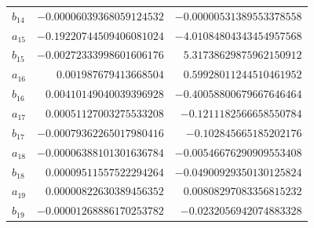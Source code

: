 \documentclass[11pt]{article}
\theoremstyle{definition}
\begin{document}
{\begin{longtable}{lrr}
$b_{14}$ & $-0.00006039368059124532$ & $-0.00000531389553378558$\\
$a_{15}$ & $-0.19220744509406081024$ & $-4.01084804343454957568$\\
$b_{15}$ & $-0.00272333998601606176$ & $5.31738629875962150912$\\
$a_{16}$ & $0.001987679413668504$ & $0.59928011244510461952$\\
$b_{16}$ & $0.00410149040039396928$ & $-0.40058800679667646464$\\
$a_{17}$ & $0.00051127003275533208$ & $-0.1211182566658550784$\\
$b_{17}$ & $-0.00079362265017980416$ & $-0.102845665185202176$\\
$a_{18}$ & $-0.00006388101301636784$ & $-0.00546676290909553408$\\
$b_{18}$ & $0.00009511557522294264$ & $-0.04900929350130125824$\\
$a_{19}$ & $0.00000822630389456352$ & $0.00808297083356815232$\\
$b_{19}$ & $-0.00001268886170253782$ & $-0.0232056942074883328$\\
\bottomrule
\end{longtable}}
\end{document}
